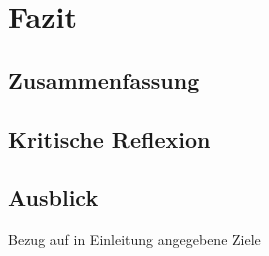 \section{Fazit}
\label{sec:fazit}

\subsection{Zusammenfassung}
\subsection{Kritische Reflexion}
\subsection{Ausblick}

Bezug auf in Einleitung angegebene Ziele